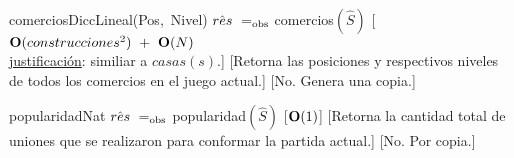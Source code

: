 \begin{Interfaz}
    \InterfazFuncion
    {comercios}{}{DiccLineal(Pos,\ Nivel)}
    {$\hat{res}\ \igobs\ $comercios$(\hat{S})$}
    [$\bold{O}(construcciones^{2})\ +\ \bold{O}(N)$
    \\ \underline{justificación}: similiar a $casas(s)$.] %
    [Retorna las posiciones y respectivos niveles de todos los comercios en el juego actual.]
    [No. Genera una copia.]

    \InterfazFuncion
    {popularidad}{}{Nat}
    {$\hat{res}\ \igobs\ $popularidad$(\hat{S})$}
    [$\bold{O}(1)$]
    [Retorna la cantidad total de uniones que se realizaron para conformar la partida actual.]
    [No. Por copia.]


\end{Interfaz}
